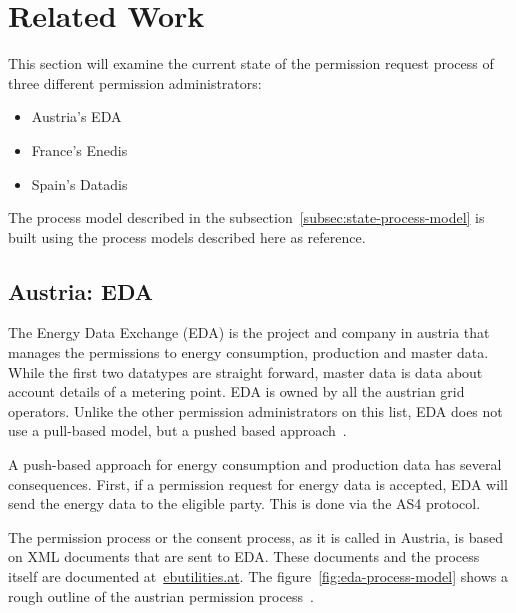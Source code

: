 \section{Related Work}\label{sec:related-work}
This section will examine the current state of the permission request process of three different permission administrators:
\begin{itemize}
    \item{}Austria's EDA
    \item{}France's Enedis
    \item{}Spain's Datadis
\end{itemize}

The process model described in the subsection\ \ref{subsec:state-process-model} is built using the process models described here as reference.

\subsection{Austria: EDA}\label{subsec:austria:-eda}
The Energy Data Exchange (EDA) is the project and company in austria that manages the permissions to energy consumption, production and master data.
While the first two datatypes are straight forward, master data is data about account details of a metering point.
EDA is owned by all the austrian grid operators.
Unlike the other permission administrators on this list, EDA does not use a pull-based model, but a pushed based approach~\cite{eda}.

A push-based approach for energy consumption and production data has several consequences.
First, if a permission request for energy data is accepted, EDA will send the energy data to the eligible party.
This is done via the AS4 protocol\cite{eda}.

The permission process or the consent process, as it is called in Austria, is based on XML documents that are sent to EDA.
These documents and the process itself are documented at\ \href{https://www.ebutilities.at/}{ebutilities.at}.
The figure\ \ref{fig:eda-process-model} shows a rough outline of the austrian permission process~\cite{ebutilities}.

